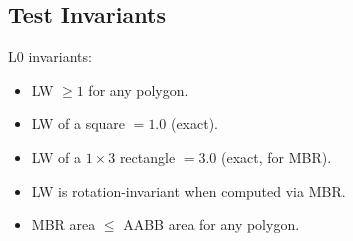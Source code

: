 \subsection{Test Invariants}

L0 invariants:
\begin{itemize}
  \item LW $\geq 1$ for any polygon.
  \item LW of a square $= 1.0$ (exact).
  \item LW of a $1 \times 3$ rectangle $= 3.0$ (exact, for MBR).
  \item LW is rotation-invariant when computed via MBR.
  \item MBR area $\leq$ AABB area for any polygon.
\end{itemize}
